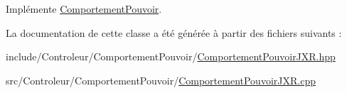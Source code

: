 \-Implémente \hyperlink{class_comportement_pouvoir_a8b8f4e753291ab73ab0016106f3948ff}{\-Comportement\-Pouvoir}.



\-La documentation de cette classe a été générée à partir des fichiers suivants \-:\begin{DoxyCompactItemize}
\item 
include/\-Controleur/\-Comportement\-Pouvoir/\hyperlink{_comportement_pouvoir_j_x_r_8hpp}{\-Comportement\-Pouvoir\-J\-X\-R.\-hpp}\item 
src/\-Controleur/\-Comportement\-Pouvoir/\hyperlink{_comportement_pouvoir_j_x_r_8cpp}{\-Comportement\-Pouvoir\-J\-X\-R.\-cpp}\end{DoxyCompactItemize}
